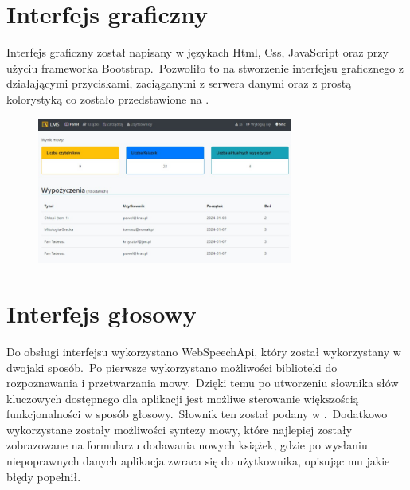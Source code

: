 \section{Interfejs graficzny}
Interfejs graficzny został napisany w językach Html, Css, JavaScript oraz przy użyciu frameworka Bootstrap.\ Pozwoliło to na stworzenie interfejsu graficznego z działającymi przyciskami, zaciąganymi z serwera danymi oraz z prostą kolorystyką co zostało przedstawione na .

\begin{figure}[H]
    \centering
    \includegraphics[width=0.75\textwidth]{images/gui}
    \label{fig:gui}
\end{figure}

\section{Interfejs głosowy}
Do obsługi interfejsu wykorzystano WebSpeechApi, który został wykorzystany w dwojaki sposób.\ Po pierwsze wykorzystano możliwości biblioteki do rozpoznawania i przetwarzania mowy.\ Dzięki temu po utworzeniu słownika słów kluczowych dostępnego dla aplikacji jest możliwe sterowanie większością funkcjonalności w sposób głosowy.\ Słownik ten został podany w .\ Dodatkowo wykorzystane zostały możliwości syntezy mowy, które najlepiej zostały zobrazowane na formularzu dodawania nowych książek, gdzie po wysłaniu niepoprawnych danych aplikacja zwraca się do użytkownika, opisując mu jakie błędy popełnił.

